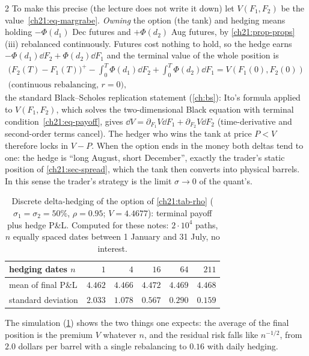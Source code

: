 \begin{paracol}{2}
To make this precise (the lecture does not write it down) let $V(F_1,F_2)$ be the value~\eqref{ch21:eq-margrabe}. \emph{Owning} the option (the tank) and hedging means holding $-\Phi(d_1)$ Dec futures and $+\Phi(d_2)$
Aug futures, by \cref{ch21:prop-props}(iii) rebalanced continuously. Futures cost nothing to hold, so the hedge earns $-\Phi(d_1)\dd F_2+\Phi(d_2)\dd F_1$ and the terminal value of the whole position is
\[
\begin{gathered}
  \bigl(F_2(T)-F_1(T)\bigr)^+-\int_0^T\Phi(d_1)\dd F_2+\int_0^T\Phi(d_2)\dd F_1=V(F_1(0),F_2(0))\\
  \text{(continuous rebalancing, } r=0),
\end{gathered}
\]
the standard Black--Scholes replication statement (\cref{ch:bs}): Ito's formula applied to $V(F_1,F_2)$, which solves the two-dimensional Black equation with terminal
condition~\eqref{ch21:eq-payoff}, gives $\dd V=\partial_{F_1}V\dd F_1+\partial_{F_2}V\dd F_2$ (time-derivative and second-order terms cancel).
The hedger who wins the tank at price $P<V$ therefore locks in $V-P$. When the option ends in the money both deltas tend to one: the hedge is ``long August, short December'', exactly the
trader's static position of \cref{ch21:sec-spread}, which the tank then converts into physical barrels. In this sense the trader's strategy is the limit $\sigma\to0$ of the quant's.

\begin{table}[ht]
\centering
\begin{tabular}{@{}l r r r r r@{}}
\toprule
hedging dates $n$ & $1$ & $4$ & $16$ & $64$ & $211$\\
\midrule
mean of final P\&L & $4.462$ & $4.466$ & $4.472$ & $4.469$ & $4.468$\\
standard deviation & $2.033$ & $1.078$ & $0.567$ & $0.290$ & $0.159$\\
\bottomrule
\end{tabular}
\caption{Discrete delta-hedging of the option of \cref{ch21:tab-rho} ($\sigma_1=\sigma_2=50\%$, $\rho=0.95$; $V=4.4677$): terminal payoff plus hedge P\&L. Computed for these notes: $2\cdot10^4$ paths, $n$ equally spaced dates between 1 January and 31 July, no interest.}\label{ch21:tab-hedge}
\end{table}
The simulation (\cref{ch21:tab-hedge}) shows the two things one expects: the average of the final position is the premium $V$ whatever $n$, and the residual risk falls like $n^{-1/2}$, from $2.0$ dollars per barrel with a single rebalancing to $0.16$ with daily hedging.


\end{paracol}
